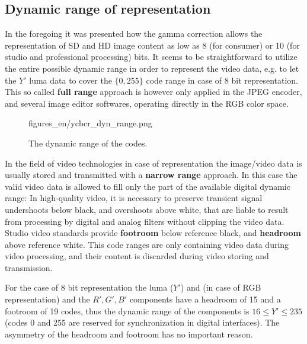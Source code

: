 \subsection{Dynamic range of \ycbcr representation}

In the foregoing it was presented how the gamma correction allows the representation of SD and HD image content as low as 8 (for consumer) or 10 (for studio and professional processing) bits.
It seems to be straightforward to utilize the entire possible dynamic range in order to represent the video data, e.g. to let the $Y'$ luma data to cover the $\lbrace 0, 255 \rbrace$ code range in case of 8 bit representation.
This so called \textbf{full range} approach is however only applied in the JPEG encoder, and several image editor softwares, operating directly in the RGB color space.


\begin{figure}[]
	\centering
	\begin{overpic}[width = 0.7\columnwidth ]{figures_en/ycbcr_dyn_range.png}
	\end{overpic}
	\caption{The dynamic range of the \ycbcr codes.}
	\label{Fig:ycbcr_dyn_range}
\end{figure}
In the field of video technologies in case of \ycbcr representation the image/video data is usually stored and transmitted with a \textbf{narrow range} approach.
In this case the valid video data is allowed to fill only the part of the available digital dynamic range:
In high-quality video, it is necessary to preserve transient signal undershoots below black, and overshoots above white, that are liable to result from processing by digital and analog filters without clipping the video data. 
Studio video standards provide \textbf{footroom} below reference black, and \textbf{headroom} above reference white. 
This code ranges are only containing video data during video processing, and their content is discarded during video storing and transmission.

For the case of 8 bit representation the luma ($Y'$) and (in case of RGB representation) and the $R',G',B'$ components have a headroom of 15 and a footroom of 19 codes, thus the dynamic range of the components is $16 \leq Y' \leq 235$ (codes 0 and 255 are reserved for synchronization in digital interfaces).
The asymmetry of the headroom and footroom has no important reason.

